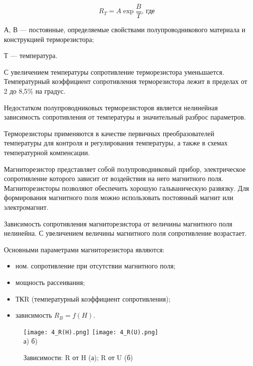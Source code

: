 \begin{equation}
R_{T}=A\exp{\frac{B}{T}}\text{, где}
\end{equation}
\par А, В --- постоянные, определяемые свойствами полупроводникового материала и конструкцией терморезистора;
\par Т --- температура.

С увеличением температуры сопротивление терморезистора уменьшается. Температурный коэффициент сопротивления терморезистора лежит в пределах от 2 до 8,5\% на градус.

Недостатком полупроводниковых терморезисторов является нелинейная зависимость сопротивления от температуры и значительный разброс параметров.

Терморезисторы применяются в качестве первичных преобразователей температуры для контроля и регулирования температуры, а также в схемах температурной компенсации.

Магниторезистор представляет собой полупроводниковый прибор, электрическое сопротивление которого зависит от воздействия на него магнитного поля. Магниторезисторы позволяют обеспечить хорошую гальваническую развязку. Для формирования магнитного поля можно использовать постоянный магнит или электромагнит.

Зависимость сопротивления магниторезистора от величины магнитного поля нелинейна. С увеличением величины магнитного поля сопротивление возрастает.

Основными параметрами магниторезистора являются:

\begin{itemize}
\item ном. сопротивление при отсутствии магнитного поля;
\item мощность рассеивания;
\item ТКR (температурный коэффициент сопротивления);
\item зависимость $R_{B} = f(H)$.
\end{itemize}


\begin{figure}[H]
\centering
\texttt{[image: 4\_R(H).png]}
\hspace{1cm}
\texttt{[image: 4\_R(U).png]}
\\а) \hspace{0.4\textwidth} б)
\caption{Зависимости: R от H (а); R от U (б)}
\label{fig:4_R(U/H)}
\end{figure}

